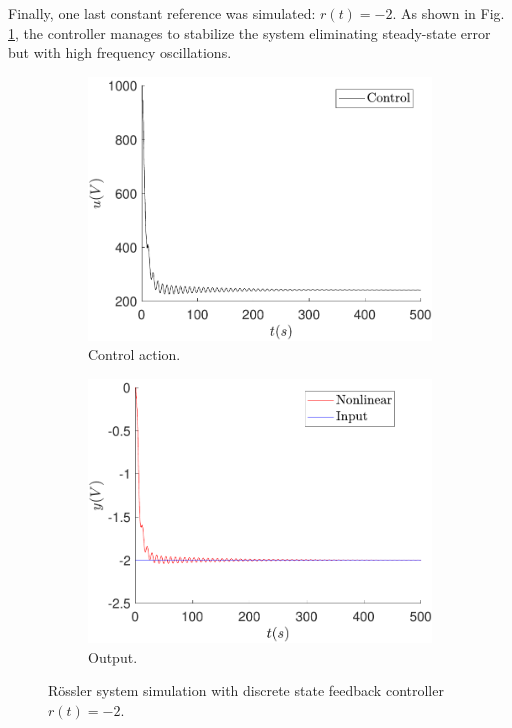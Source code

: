 	Finally, one last constant reference was simulated: $r(t)=-2$. As shown in Fig. \ref{fig:feedback_u_-2}, the controller manages to stabilize the system eliminating steady-state error but with high frequency oscillations.
	
	\begin{figure}
        \centering
        \begin{subfigure}[b]{0.475\textwidth}
            \centering
            \includegraphics[scale=0.425]{files/feedback/Ref!0/control_sfc_u_-2_ref_dif_0.pdf}
            \caption{Control action.}
        \end{subfigure}
        \vskip0.1cm
        \begin{subfigure}[b]{0.475\textwidth}   
            \centering 
            \includegraphics[scale=0.425]{files/feedback/Ref!0/sfc_u_-2_ref_dif_0.pdf}
            \caption{Output.}
        \end{subfigure}
        \caption{Rössler system simulation with discrete state feedback controller $r(t)=-2$.}
        \label{fig:feedback_u_-2}
	\end{figure}
	
